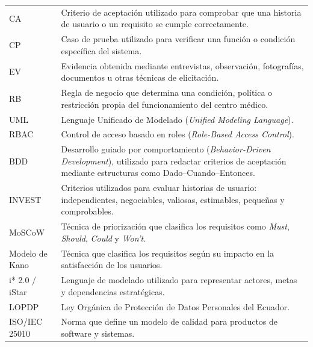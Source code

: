 \documentclass[11pt,a4paper]{article}
\begin{document}
\begin{longtable}{p{} p{}}
		CA &
		Criterio de aceptación utilizado para comprobar que una historia de usuario o un requisito se cumple correctamente. \\
		
		CP &
		Caso de prueba utilizado para verificar una función o condición específica del sistema. \\
		
		EV &
		Evidencia obtenida mediante entrevistas, observación, fotografías, documentos u otras técnicas de elicitación. \\
		
		RB &
		Regla de negocio que determina una condición, política o restricción propia del funcionamiento del centro médico. \\
		
		UML &
		Lenguaje Unificado de Modelado (\textit{Unified Modeling Language}). \\
		
		RBAC &
		Control de acceso basado en roles (\textit{Role-Based Access Control}). \\
		
		BDD &
		Desarrollo guiado por comportamiento (\textit{Behavior-Driven Development}), utilizado para redactar criterios de aceptación mediante estructuras como Dado--Cuando--Entonces. \\
		
		INVEST &
		Criterios utilizados para evaluar historias de usuario: independientes, negociables, valiosas, estimables, pequeñas y comprobables. \\
		
		MoSCoW &
		Técnica de priorización que clasifica los requisitos como \textit{Must}, \textit{Should}, \textit{Could} y \textit{Won't}. \\
		
		Modelo de Kano &
		Técnica que clasifica los requisitos según su impacto en la satisfacción de los usuarios. \\
		
		i* 2.0 / iStar &
		Lenguaje de modelado utilizado para representar actores, metas y dependencias estratégicas. \\
		
		LOPDP &
		Ley Orgánica de Protección de Datos Personales del Ecuador. \\
		
		ISO/IEC 25010 &
		Norma que define un modelo de calidad para productos de software y sistemas. \\
		

\end{longtable}
\end{document}
